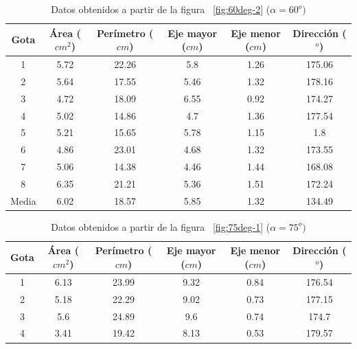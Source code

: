 \begin{table}[H] \centering \caption{Datos obtenidos a partir de la figura
    ~\ref{fig:60deg-2} ($\alpha=60^o)$} \label{tab:60deg-2}
    \begin{tabular}{cccccc} \toprule Gota & Área ($cm^2$) & Perímetro ($cm$) &
        Eje mayor ($cm$) & Eje menor ($cm$) & Dirección ($^o$) \\ \midrule 1 &
        5.72 & 22.26 & 5.8  & 1.26 & 175.06 \\ 2 & 5.64 & 17.55 & 5.46 & 1.32 &
        178.16 \\ 3 & 4.72 & 18.09 & 6.55 & 0.92 & 174.27 \\ 4 & 5.02 & 14.86 &
        4.7  & 1.36 & 177.54 \\ 5 & 5.21 & 15.65 & 5.78 & 1.15 & 1.8    \\ 6 &
        4.86 & 23.01 & 4.68 & 1.32 & 173.55 \\ 7 & 5.06 & 14.38 & 4.46 & 1.44 &
        168.08 \\ 8 & 6.35 & 21.21 & 5.36 & 1.51 & 172.24 \\ \midrule Media
        \footnotemark & 6.02 &	18.57 &	5.85 &	1.32 &	134.49 \\ \bottomrule
    \end{tabular} \end{table} 

\begin{table}[H] \centering \caption{Datos obtenidos a partir de la figura
    ~\ref{fig:75deg-1} ($\alpha=75^o)$} \label{tab:75deg-1}
    \begin{tabular}{cccccc} \toprule Gota & Área ($cm^2$) & Perímetro ($cm$) &
        Eje mayor ($cm$) & Eje menor ($cm$) & Dirección ($^o$) \\ \midrule 1 &
        6.13 & 23.99 & 9.32 & 0.84 & 176.54 \\ 2 & 5.18 & 22.29 & 9.02 & 0.73 &
        177.15 \\ 3 & 5.6  & 24.89 & 9.6  & 0.74 & 174.7  \\ 4 & 3.41 & 19.42 &
        8.13 & 0.53 & 179.57 \\ \bottomrule \end{tabular} \end{table}

